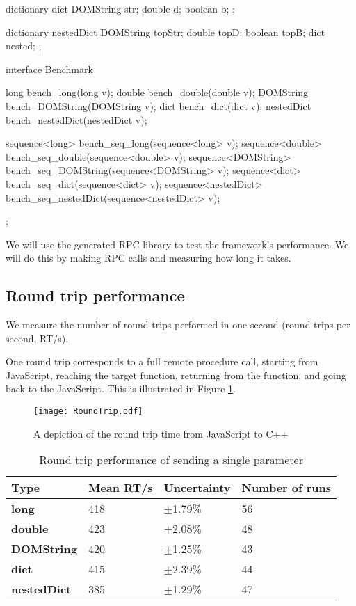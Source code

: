 \begin{code}
dictionary dict {
  DOMString str;
  double d;
  boolean b;
};

dictionary nestedDict {
  DOMString topStr;
  double topD;
  boolean topB;
  dict nested;
};

interface Benchmark{
  long bench_long(long v);
  double bench_double(double v);
  DOMString bench_DOMString(DOMString v);
  dict bench_dict(dict v);
  nestedDict bench_nestedDict(nestedDict v);

  sequence<long> bench_seq_long(sequence<long> v);
  sequence<double> bench_seq_double(sequence<double> v);
  sequence<DOMString> bench_seq_DOMString(sequence<DOMString> v);
  sequence<dict> bench_seq_dict(sequence<dict> v);
  sequence<nestedDict> bench_seq_nestedDict(sequence<nestedDict> v);
};
\end{code}

We will use the generated RPC library to test the framework's performance. We will do this by making RPC calls and measuring how long it takes.

\subsection{Round trip performance}\label{round-trip-performance}

We measure the number of round trips performed in one second (round trips per second, RT/s).

One round trip corresponds to a full remote procedure call, starting from JavaScript, reaching the target function, returning from the function, and going back to the JavaScript. This is illustrated in Figure \ref{fig:rpc_roundtrip}.


\begin{figure}
    \centering
    \texttt{[image: RoundTrip.pdf]} 
    \caption{A depiction of the round trip time from JavaScript to C++}
    \label{fig:rpc_roundtrip}
\end{figure}


\begin{table}[h]
\begin{tabular}{l|lll}
\textbf{Type}       & \textbf{Mean RT/s} & \textbf{Uncertainty} & \textbf{Number of runs} \\ \hline
\textbf{long}       & 418                & $\pm$1.79\%              & 56                      \\
\textbf{double}     & 423                & $\pm$2.08\%              & 48                      \\
\textbf{DOMString}  & 420                & $\pm$1.25\%              & 43                      \\
\textbf{dict}       & 415                & $\pm$2.39\%              & 44                      \\
\textbf{nestedDict} & 385                & $\pm$1.29\%              & 47                     
\end{tabular}
\caption{Round trip performance of sending a single parameter}
\label{table:roundtrip_single_param}
\end{table}


